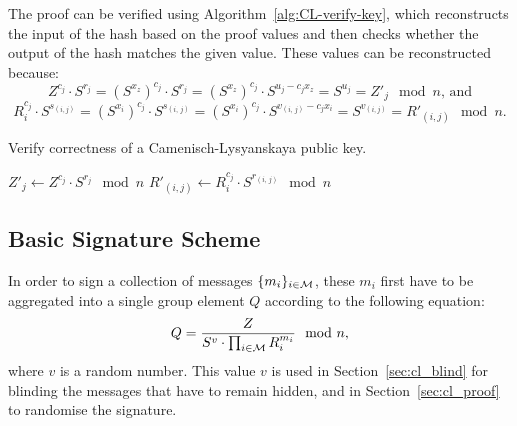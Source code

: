 The proof can be verified using Algorithm~\ref{alg:CL-verify-key}, which
reconstructs the input of the hash based on the proof values and then checks
whether the output of the hash matches the given value. These values can be
reconstructed because:
\begin{equation*}
  Z^{c_j} \cdot S^{r_j}
  = (S^{x_z})^{c_j} \cdot S^{r_j}
  = (S^{x_z})^{c_j} \cdot S^{u_j - c_j x_z}
  = S^{u_j}
  = Z'_j \mod n \text{, and}
\end{equation*}
\begin{equation*}
  R_i^{c_j} \cdot S^{s_{(i,j)}}
  = (S^{x_i})^{c_j} \cdot S^{s_{(i,\, j)}}
  = (S^{x_i})^{c_j} \cdot S^{v_{(i,\, j)}-c_j x_i}
  = S^{v_{(i,j)}}
  = R'_{(i,j)} \mod n \text{.}
\end{equation*}

\begin{algorithm}
  \caption{Verify correctness of a Camenisch-Lysyanskaya public key.}
  \label{alg:CL-verify-key}
  \addtolength{\baselineskip}{1mm}
  \begin{algorithmic}[1]
        \State $Z'_j \gets Z^{c_j} \cdot S^{r_j} \mod n$
          \State $R'_{(i,j)} \gets R_i^{c_j} \cdot S^{r_{(i,\, j)}} \mod n$
        \EndFor
      \EndFor

        \Return {}
      \EndIf

      \Return {}
    \EndFunction
  \end{algorithmic}
\end{algorithm}

\subsection{Basic Signature Scheme}\label{sec:cl_basic}

In order to sign a collection of messages $\{m_i\}_{i \in \mathcal{M}}$, these $m_i$
first have to be aggregated into a single group element $Q$ according
to the following equation:
\begin{equation}\label{eqn:CL-aggregate}
  Q = \dfrac{Z}{S^v \cdot \prod_{i \in \mathcal{M}} R_i^{m_i}} \mod n\text,
\end{equation}
where $v$ is a random number. This value $v$ is used in
Section~\ref{sec:cl_blind} for blinding the messages that have to remain hidden,
and in Section~\ref{sec:cl_proof} to randomise the signature.

